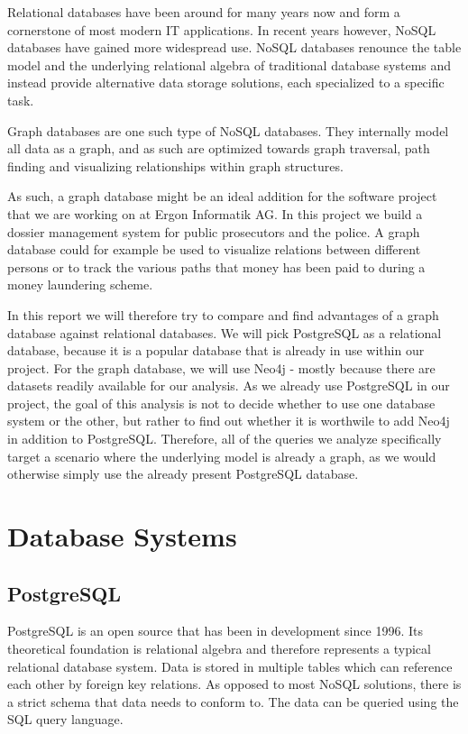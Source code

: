 \documentclass[11pt, a4paper,oneside,chapterprefix=false]{scrbook}
\begin{document}
Relational databases have been around for many years now and form a cornerstone of most modern IT applications.
In recent years however, NoSQL databases have gained more widespread use.
NoSQL databases renounce the table model and the underlying relational algebra of traditional database systems and instead provide alternative data storage solutions, each specialized to a specific task.

Graph databases are one such type of NoSQL databases.
They internally model all data as a graph, and as such are optimized towards graph traversal, path finding and visualizing relationships within graph structures.

As such, a graph database might be an ideal addition for the software project that we are working on at Ergon Informatik AG.
In this project we build a dossier management system for public prosecutors and the police.
A graph database could for example be used to visualize relations between different persons or to track the various paths that money has been paid to during a money laundering scheme.

In this report we will therefore try to compare and find advantages of a graph database against relational databases.
We will pick PostgreSQL as a relational database, because it is a popular database that is already in use within our project.
For the graph database, we will use Neo4j - mostly because there are datasets readily available for our analysis.
As we already use PostgreSQL in our project, the goal of this analysis is not to decide whether to use one database system or the other, but rather to find out whether it is worthwile to add Neo4j in addition to PostgreSQL.
Therefore, all of the queries we analyze specifically target a scenario where the underlying model is already a graph, as we would otherwise simply use the already present PostgreSQL database.

\chapter{Database Systems} \label{chp:theory}

\section{PostgreSQL}
PostgreSQL \cite{postgres} is an open source that has been in development since 1996.
Its theoretical foundation is relational algebra \cite{relationalalgebra} and therefore represents a typical relational database system.
Data is stored in multiple tables which can reference each other by foreign key relations.
As opposed to most NoSQL solutions, there is a strict schema that data needs to conform to.
The data can be queried using the SQL query language.
\end{document}
